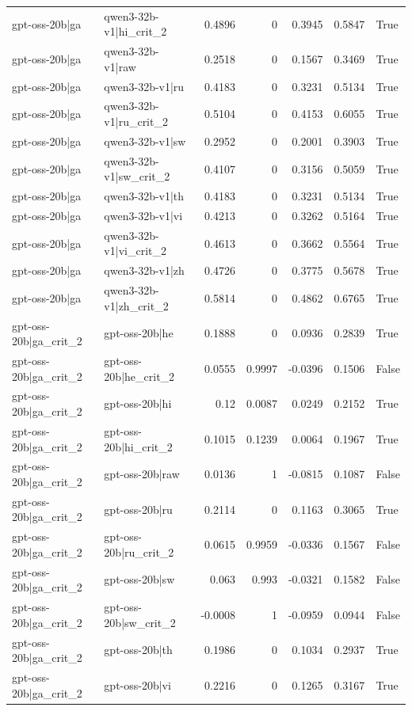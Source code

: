 \begin{table}
\begin{tabular}{l l r r r r l}
gpt-oss-20b|ga & qwen3-32b-v1|hi_crit_2 & 0.4896 & 0 & 0.3945 & 0.5847 & True \\
gpt-oss-20b|ga & qwen3-32b-v1|raw & 0.2518 & 0 & 0.1567 & 0.3469 & True \\
gpt-oss-20b|ga & qwen3-32b-v1|ru & 0.4183 & 0 & 0.3231 & 0.5134 & True \\
gpt-oss-20b|ga & qwen3-32b-v1|ru_crit_2 & 0.5104 & 0 & 0.4153 & 0.6055 & True \\
gpt-oss-20b|ga & qwen3-32b-v1|sw & 0.2952 & 0 & 0.2001 & 0.3903 & True \\
gpt-oss-20b|ga & qwen3-32b-v1|sw_crit_2 & 0.4107 & 0 & 0.3156 & 0.5059 & True \\
gpt-oss-20b|ga & qwen3-32b-v1|th & 0.4183 & 0 & 0.3231 & 0.5134 & True \\
gpt-oss-20b|ga & qwen3-32b-v1|vi & 0.4213 & 0 & 0.3262 & 0.5164 & True \\
gpt-oss-20b|ga & qwen3-32b-v1|vi_crit_2 & 0.4613 & 0 & 0.3662 & 0.5564 & True \\
gpt-oss-20b|ga & qwen3-32b-v1|zh & 0.4726 & 0 & 0.3775 & 0.5678 & True \\
gpt-oss-20b|ga & qwen3-32b-v1|zh_crit_2 & 0.5814 & 0 & 0.4862 & 0.6765 & True \\
gpt-oss-20b|ga_crit_2 & gpt-oss-20b|he & 0.1888 & 0 & 0.0936 & 0.2839 & True \\
gpt-oss-20b|ga_crit_2 & gpt-oss-20b|he_crit_2 & 0.0555 & 0.9997 & -0.0396 & 0.1506 & False \\
gpt-oss-20b|ga_crit_2 & gpt-oss-20b|hi & 0.12 & 0.0087 & 0.0249 & 0.2152 & True \\
gpt-oss-20b|ga_crit_2 & gpt-oss-20b|hi_crit_2 & 0.1015 & 0.1239 & 0.0064 & 0.1967 & True \\
gpt-oss-20b|ga_crit_2 & gpt-oss-20b|raw & 0.0136 & 1 & -0.0815 & 0.1087 & False \\
gpt-oss-20b|ga_crit_2 & gpt-oss-20b|ru & 0.2114 & 0 & 0.1163 & 0.3065 & True \\
gpt-oss-20b|ga_crit_2 & gpt-oss-20b|ru_crit_2 & 0.0615 & 0.9959 & -0.0336 & 0.1567 & False \\
gpt-oss-20b|ga_crit_2 & gpt-oss-20b|sw & 0.063 & 0.993 & -0.0321 & 0.1582 & False \\
gpt-oss-20b|ga_crit_2 & gpt-oss-20b|sw_crit_2 & -0.0008 & 1 & -0.0959 & 0.0944 & False \\
gpt-oss-20b|ga_crit_2 & gpt-oss-20b|th & 0.1986 & 0 & 0.1034 & 0.2937 & True \\
gpt-oss-20b|ga_crit_2 & gpt-oss-20b|vi & 0.2216 & 0 & 0.1265 & 0.3167 & True \\

\end{tabular}
\end{table}
